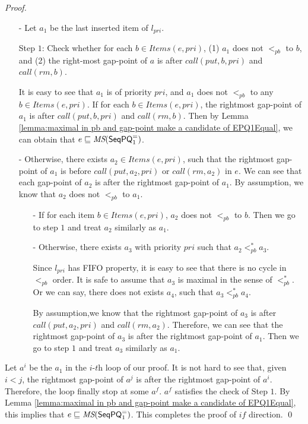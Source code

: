 \begin {proof}
\begin{itemize}
\item[-] Let $a_1$ be the last inserted item of $l_{\textit{pri}}$.

    Step $1$: Check whether for each $b \in \textit{Items}(e,\textit{pri})$, (1) $a_1$ does not $<_{\textit{pb}}$ to $b$, and (2) the right-most gap-point of $a$ is after $\textit{call}(\textit{put},b,\textit{pri})$ and $\textit{call}(\textit{rm},b)$.

    It is easy to see that $a_1$ is of priority $\textit{pri}$, and $a_1$ does not $<_{\textit{pb}}$ to any $b \in \textit{Items}(e,\textit{pri})$. If for each $b \in \textit{Items}(e,\textit{pri})$, the rightmost gap-point of $a_1$ is after $\textit{call}(\textit{put},b,\textit{pri})$ and $\textit{call}(\textit{rm},b)$. Then by Lemma \ref{lemma:maximal in pb and gap-point make a candidate of EPQ1Equal}, we can obtain that $e \sqsubseteq \textit{MS}(\mathsf{SeqPQ}_1^{=})$.


\item[-] Otherwise, there exists $a_2 \in \textit{Items}(e,\textit{pri})$, such that the rightmost gap-point of $a_1$ is before $\textit{call}(\textit{put},a_2,\textit{pri})$ or $\textit{call}(\textit{rm},a_2)$ in $e$. We can see that each gap-point of $a_2$ is after the rightmost gap-point of $a_1$.%
    By assumption, we know that $a_2$ does not $<_{\textit{pb}}$ to $a_1$.

    \begin{itemize}
    \setlength{\itemsep}{0.5pt}
    \item[-] If for each item $b \in \textit{Items}(e,\textit{pri})$, $a_2$ does not $<_{\textit{pb}}$ to $b$. Then we go to step $1$ and treat $a_2$ similarly as $a_1$.
    \item[-] Otherwise, there exists $a_3$ with priority $\textit{pri}$ such that $a_2 <_{\textit{pb}}^* a_3$.

    Since $l_{\textit{pri}}$ has FIFO property, it is easy to see that there is no cycle in $<_{\textit{pb}}$ order. It is safe to assume that $a_3$ is maximal in the sense of $<_{\textit{pb}}^*$. Or we can say, there does not exists $a_4$, such that $a_3 <_{\textit{pb}}^* a_4$.

    By assumption,we know that the rightmost gap-point of $a_3$ is after $\textit{call}(\textit{put},a_2,\textit{pri})$ and $\textit{call}(\textit{rm},a_2)$. Therefore, we can see that the rightmost gap-point of $a_3$ is after the rightmost gap-point of $a_1$. Then we go to step $1$ and treat $a_3$ similarly as $a_1$.
    \end{itemize}
\end{itemize}

Let $a^i$ be the $a_1$ in the $\textit{i-th}$ loop of our proof. It is not hard to see that, given $i<j$, the rightmost gap-point of $a^j$ is after the rightmost gap-point of $a^i$. Therefore, the loop finally stop at some $a^f$. $a^f$ satisfies the check of Step $1$. By Lemma \ref{lemma:maximal in pb and gap-point make a candidate of EPQ1Equal}, this implies that $e \sqsubseteq \textit{MS}(\mathsf{SeqPQ}_1^{=})$. This completes the proof of $\textit{if}$ direction. \qed
\end {proof}
